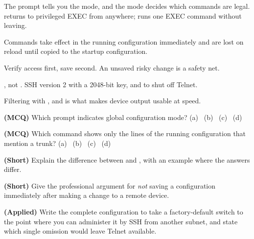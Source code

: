 \begin{chaptersummary}
\begin{tight}
  \item The prompt tells you the mode, and the mode decides which commands are
        legal.  returns to privileged EXEC from anywhere;  runs
        one EXEC command without leaving.
  \item Commands take effect in the running configuration immediately and are
        lost on reload until copied to the startup configuration.
  \item Verify access first, save second. An unsaved risky change is a safety net.
  \item {}, not . SSH version 2 with a
        2048-bit key, and  to shut off Telnet.
  \item Filtering with ,  and  is what
        makes device output usable at speed.
\end{tight}
\end{chaptersummary}

\begin{reviewq}
  \item \textbf{(MCQ)} Which prompt indicates global configuration mode?
        (a)~ (b)~ (c)~ (d)~
  \item \textbf{(MCQ)} Which command shows only the lines of the running
        configuration that mention a trunk?
        (a)~ (b)~
        (c)~ (d)~
  \item \textbf{(Short)} Explain the difference between  and
        , with an example where the answers differ.
  \item \textbf{(Short)} Give the professional argument for \emph{not} saving a
        configuration immediately after making a change to a remote device.
  \item \textbf{(Applied)} Write the complete configuration to take a
        factory-default switch to the point where you can administer it by SSH
        from another subnet, and state which single omission would leave Telnet
        available.
\end{reviewq}
